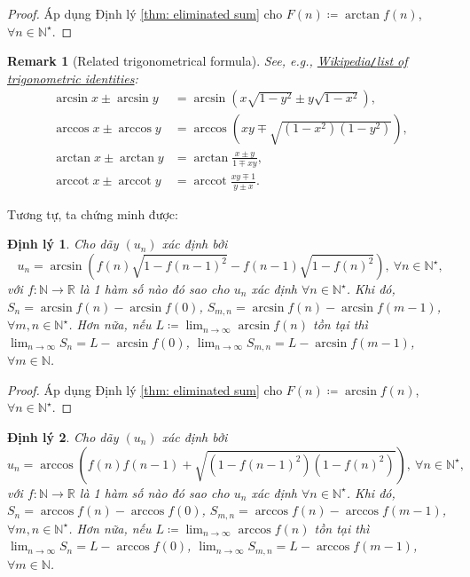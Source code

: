 \documentclass{article}
\newtheorem{dinhly}{Định lý}
\newtheorem{remark}{Remark}
\begin{document}
\begin{proof}
	Áp dụng Định lý \ref{thm: eliminated sum} cho $F(n)\coloneqq\arctan f(n)$, $\forall n\in\mathbb{N}^\star$.
\end{proof}

\begin{remark}[Related trigonometrical formula]
	See, e.g., \href{https://en.wikipedia.org/wiki/List_of_trigonometric_identities}{Wikipedia{\tt/}list of trigonometric identities}:
	\begin{align*}
		\arcsin x\pm\arcsin y &= \arcsin(x\sqrt{1 - y^2}\pm y\sqrt{1 - x^2}),\\
		\arccos x\pm\arccos y &= \arccos\left(xy\mp\sqrt{(1 - x^2)(1 - y^2)}\right),\\
		\arctan x\pm\arctan y &= \arctan\frac{x\pm y}{1\mp xy},\\
		\operatorname{arccot}x\pm\operatorname{arccot}y &= \operatorname{arccot}\frac{xy\mp1}{y\pm x}.
	\end{align*}
\end{remark}
Tương tự, ta chứng minh được:

\begin{dinhly}
	Cho dãy $(u_n)$ xác định bởi
	\begin{equation*}
		u_n = \arcsin\left(f(n)\sqrt{1 - f(n-1)^2} - f(n-1)\sqrt{1 - f(n)^2}\right),\ \forall n\in\mathbb{N}^\star,
	\end{equation*}
	với $f:\mathbb{N}\to\mathbb{R}$ là 1 hàm số nào đó sao cho $u_n$ xác định $\forall n\in\mathbb{N}^\star$. Khi đó, $S_n = \arcsin f(n) - \arcsin f(0)$, $S_{m,n} = \arcsin f(n) - \arcsin f(m - 1)$, $\forall m,n\in\mathbb{N}^\star$. Hơn nữa, nếu $L\coloneqq\lim_{n\to\infty} \arcsin f(n)$ tồn tại thì $\lim_{n\to\infty} S_n = L - \arcsin f(0)$, $\lim_{n\to\infty} S_{m,n} = L - \arcsin f(m - 1)$, $\forall m\in\mathbb{N}$.
\end{dinhly}

\begin{proof}
	Áp dụng Định lý \ref{thm: eliminated sum} cho $F(n)\coloneqq\arcsin f(n)$, $\forall n\in\mathbb{N}^\star$.
\end{proof}

\begin{dinhly}
	Cho dãy $(u_n)$ xác định bởi
	\begin{equation*}
		u_n = \arccos\left(f(n)f(n-1) + \sqrt{(1 - f(n-1)^2)(1 - f(n)^2)}\right),\ \forall n\in\mathbb{N}^\star,
	\end{equation*}
	với $f:\mathbb{N}\to\mathbb{R}$ là 1 hàm số nào đó sao cho $u_n$ xác định $\forall n\in\mathbb{N}^\star$. Khi đó, $S_n = \arccos f(n) - \arccos f(0)$, $S_{m,n} = \arccos f(n) - \arccos f(m - 1)$, $\forall m,n\in\mathbb{N}^\star$. Hơn nữa, nếu $L\coloneqq\lim_{n\to\infty} \arccos f(n)$ tồn tại thì $\lim_{n\to\infty} S_n = L - \arccos f(0)$, $\lim_{n\to\infty} S_{m,n} = L - \arccos f(m - 1)$, $\forall m\in\mathbb{N}$.
\end{dinhly}
\end{document}

